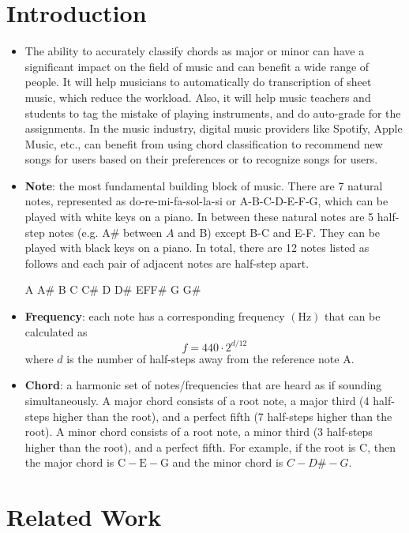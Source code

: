 \documentclass[11pt]{article}
\begin{document}
\section*{Introduction}

\begin{itemize}
\item The ability to accurately classify chords as major or minor can have a significant impact on the field of music and can benefit a wide range of people. It will help musicians to automatically do transcription of sheet music, which reduce the workload. Also, it will help music teachers and students to tag the mistake of playing instruments, and do auto-grade for the assignments. In the music industry, digital music providers like Spotify, Apple Music, etc., can benefit from using chord classification to recommend new songs for users based on their preferences or to recognize songs for users.
\item \textbf{Note}: the most fundamental building block of music. There are 7 natural notes, represented as do-re-mi-fa-sol-la-si or A-B-C-D-E-F-G, which can be played with white keys on a piano. In between these natural notes are 5 half-step notes (e.g. A\# between $A$ and B) except B-C and E-F. They can be played with black keys on a piano. In total, there are 12 notes listed as follows and each pair of adjacent notes are half-step apart.

A A\# B C C\# D D\# EFF\# G G\#
\item \textbf{Frequency}: each note has a corresponding frequency $(\mathrm{Hz})$ that can be calculated as
$$
f=440 \cdot 2^{d / 12}
$$
where $d$ is the number of half-steps away from the reference note $\mathrm{A}$.

        \item  \textbf{Chord}: a harmonic set of notes/frequencies that are heard as if sounding simultaneously. A major chord consists of a root note, a major third (4 half-steps higher than the root), and a perfect fifth (7 half-steps higher than the root). A minor chord consists of a root note, a minor third (3 half-steps higher than the root), and a perfect fifth. For example, if the root is $\mathrm{C}$, then the major chord is $\mathrm{C}-\mathrm{E}-\mathrm{G}$ and the minor chord is $C-D \#-G$.
  

\end{itemize}

\section*{Related Work}
\end{document}
